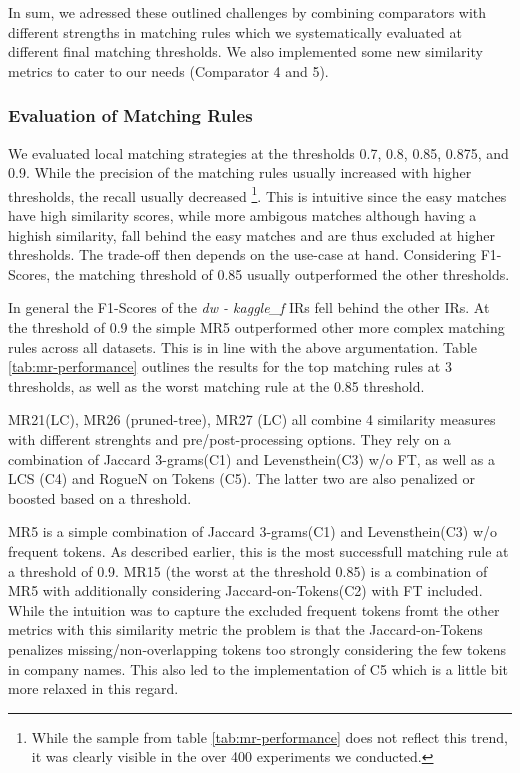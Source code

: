\documentclass[11pt,titlepage,oneside,openany]{article}
\begin{document}
In sum, we adressed these outlined challenges by combining comparators with different strengths in matching rules which we systematically evaluated at different final matching thresholds. We also implemented some new similarity metrics to cater to our needs (Comparator 4 and 5).



\subsubsection{Evaluation of Matching Rules}

We evaluated local matching strategies at the thresholds 0.7, 0.8, 0.85, 0.875, and 0.9. While the precision of the matching rules usually increased with higher thresholds, the recall usually decreased%
\footnote{While the sample from table \ref{tab:mr-performance} does not reflect this trend, it was clearly visible in the over 400 experiments we conducted.}.%
This is intuitive since the easy matches have high similarity scores, while more ambigous matches although having a highish similarity, fall behind the easy matches and are thus excluded at higher thresholds. The trade-off then depends on the use-case at hand. Considering F1-Scores, the matching threshold of 0.85 usually outperformed the other thresholds.

In general the F1-Scores of the \textit{dw - kaggle\_f} IRs fell behind the other IRs. At the threshold of 0.9 the simple MR5 outperformed other more complex matching rules across all datasets. This is in line with the above argumentation. Table \ref{tab:mr-performance} outlines the results for the top matching rules at 3 thresholds, as well as the worst matching rule at the 0.85 threshold.

MR21(LC), MR26 (pruned-tree), MR27 (LC) all combine 4 similarity measures with different strenghts and pre/post-processing options. They rely on a combination of Jaccard 3-grams(C1) and Levensthein(C3) w/o FT, as well as a LCS (C4) and RogueN on Tokens (C5). The latter two are also penalized or boosted based on a threshold.

MR5 is a simple combination of Jaccard 3-grams(C1) and Levensthein(C3) w/o frequent tokens. As described earlier, this is the most successfull matching rule at a threshold of 0.9. MR15 (the worst at the threshold 0.85) is a combination of MR5 with additionally considering Jaccard-on-Tokens(C2) with FT included. While the intuition was to capture the excluded frequent tokens fromt the other metrics with this similarity metric the problem is that the Jaccard-on-Tokens penalizes missing/non-overlapping tokens too strongly considering the few tokens in company names. This also led to the implementation of C5 which is a little bit more relaxed in this regard.
\end{document}
